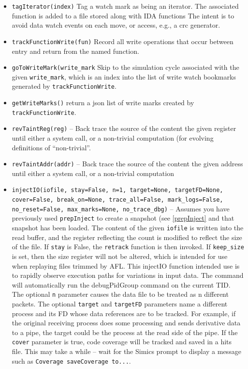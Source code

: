 \documentclass[titlepage]{article}
\begin{document}
\begin{itemize}
\item {\tt tagIterator(index)} Tag a watch mark as being an iterator.  The associated function is added to a file stored along with IDA functions
The intent is to avoid data watch events on each move, or access, e.g., a crc generator.

\item {\tt trackFunctionWrite(fun)} Record all write operations that occur between entry and return from the named function.

\item {\tt goToWriteMark(write\_mark} Skip to the simulation cycle associated with the given {\tt write\_mark}, which is an index into the list of 
write watch bookmarks generated by {\tt trackFunctionWrite}.

\item {\tt getWriteMarks()} return a json list of write marks created by {\tt trackFunctionWrite}.

\item {\tt revTaintReg(reg)} – Back trace the source of the content the given register until either a system call, or a non-trivial computation (for evolving definitions of “non-trivial”.  

\item {\tt revTaintAddr(addr)} -- Back trace the source of the content the given address until either a system call, or a non-trivial computation

\item {\tt injectIO(iofile, stay=False, n=1, target=None, targetFD=None, cover=False, break\_on=None, trace\_all=False, mark\_logs=False, no\_reset=False, max\_marks=None, no\_trace\_dbg)} -- Assumes you have previously used {\tt prepInject}
to create a snapshot (see \ref{prepInject} and that snapshot has been loaded.
The content of the given {\tt iofile} is written into the read buffer, and the register reflecting 
the count is modified to reflect the size of the file.  If {\tt stay} is False, the {\tt retrack} function is then invoked. If {\tt keep\_size} is
set, then the size register will not be altered, which is intended for use when replaying files trimmed by AFL.
This injectIO function intended use is to rapidly observe execution paths for variations in input data. The command will automatically
run the debugPidGroup command on the current TID. The optional {\tt n} parameter causes the data file to be treated as n different packets.
The optional {\tt target} and {\tt targetFD} parameters name a different process and its FD whose data references are to be tracked.  For example,
if the original receiving process does some processing and sends derivative data to a pipe, the target could be the process at the read side
of the pipe.  If the {\tt cover} parameter is true, code coverage will be tracked and saved in a hits file.  This may take a while -- wait for the
Simics prompt to display a message such as {\tt Coverage saveCoverage to...}.


\end{itemize}
\end{document}

